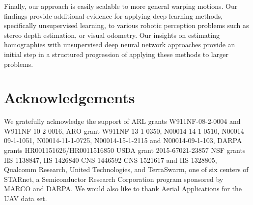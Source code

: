 \documentclass[letterpaper, 10 pt, conference]{ieeeconf}
\begin{document}
Finally, our approach is easily scalable to more general warping motions. Our findings provide additional evidence for applying deep learning methods, specifically unsupervised learning, to various robotic perception problems such as stereo depth estimation, or visual odometry. Our insights on estimating homographies with unsupervised deep neural network approaches provide an initial step in a structured progression of applying these methods to larger problems. 


\section{Acknowledgements}
We gratefully acknowledge the support of
ARL grants  W911NF-08-2-0004 and W911NF-10-2-0016, ARO grant W911NF-13-1-0350, N00014-14-1-0510, N00014-09-1-1051, N00014-11-1-0725, N00014-15-1-2115 and N00014-09-1-103, DARPA grants HR001151626/HR0011516850 USDA grant 2015-67021-23857 NSF grants IIS-1138847, IIS-1426840 CNS-1446592 CNS-1521617 and   IIS-1328805, Qualcomm Research,
United Technologies,
and TerraSwarm, one of six centers of STARnet, a Semiconductor Research Corporation program sponsored by MARCO and DARPA. We would also like to thank Aerial Applications for the UAV data set. 

\end{document}
